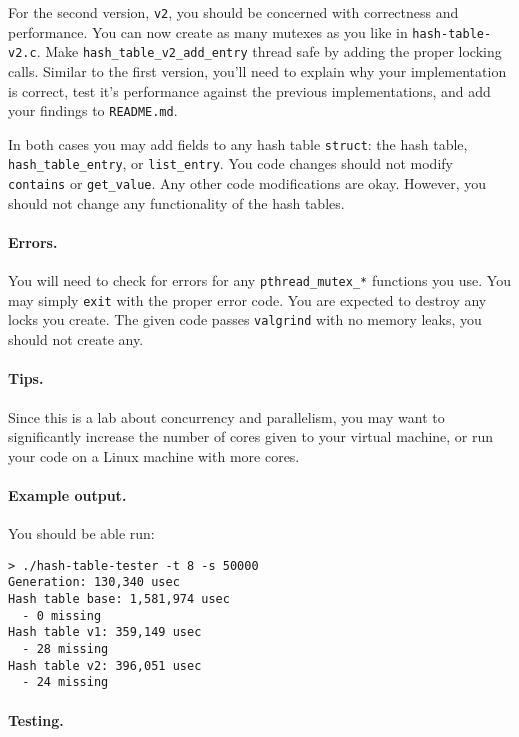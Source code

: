 For the second version, \texttt{v2}, you should be concerned with correctness
and performance.
You can now create as many mutexes as you like in \texttt{hash-table-v2.c}.
Make \texttt{hash\_table\_v2\_add\_entry} thread safe by adding the proper
locking calls.
Similar to the first version, you'll need to explain why your implementation
is correct, test it's performance against the previous implementations, and
add your findings to \texttt{README.md}.

In both cases you may add fields to any hash table \texttt{struct}: the hash
table, \texttt{hash\_table\_entry}, or \texttt{list\_entry}. You code changes
should not modify \texttt{contains} or \texttt{get\_value}. Any other code
modifications are okay. However, you should not change any functionality of the
hash tables.

\paragraph{Errors.}

You will need to check for errors for any \texttt{pthread\_mutex\_*} functions
you use.
You may simply \texttt{exit} with the proper error code.
You are expected to destroy any locks you create.
The given code passes \texttt{valgrind} with no memory leaks, you should not
create any.

\paragraph{Tips.}

Since this is a lab about concurrency and parallelism, you may want to
significantly increase the number of cores given to your virtual machine, or
run your code on a Linux machine with more cores.

\paragraph{Example output.}

You should be able run:

\begin{lstlisting}
> ./hash-table-tester -t 8 -s 50000
Generation: 130,340 usec
Hash table base: 1,581,974 usec
  - 0 missing
Hash table v1: 359,149 usec
  - 28 missing
Hash table v2: 396,051 usec
  - 24 missing
\end{lstlisting}

\paragraph{Testing.}

